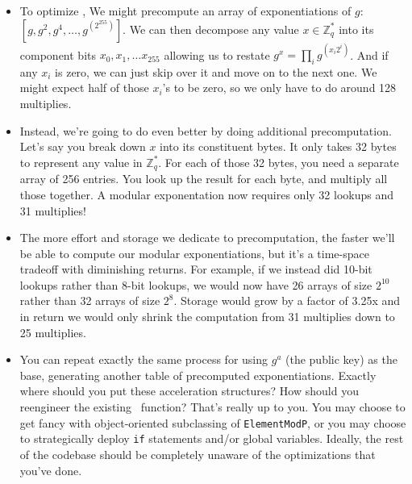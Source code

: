 \begin{itemize}
\item To optimize , We might
  precompute an array of exponentiations of $g$: $\left[g, g^2, g^4, \ldots,
    g^{\left(2^{255}\right)}\right]$.
  We can then decompose any value $x \in \mathbb{Z}_q^*$
  into its component bits $x_{0},x_{1},\ldots x_{255}$
  allowing us to restate $g^x = \prod_i g^{\left(x_i 2^i\right)}$. And if
  any $x_i$ is zero, we can just skip over it and move on to the next one.
  We might expect half of those $x_i$'s to be zero, so we only have to
  do around 128 multiplies.

\item Instead, we're going to do even better by doing additional
  precomputation. Let's say you break down $x$ into its constituent bytes.
  It only takes 32 bytes to represent any value in $\mathbb{Z}_q^*$.
  For each of those 32 bytes, you need a separate array of 256 entries.
  You look up the result for each byte, and multiply all those together.
  A modular exponentation now requires only 32 lookups and 31 multiplies!

\item The more effort and storage we dedicate to precomputation, the
  faster we'll be able to compute our modular exponentiations, but
  it's a time-space tradeoff with diminishing returns. For example, if
  we instead did 10-bit lookups rather than 8-bit lookups, we would
  now have 26 arrays of size $2^{10}$ rather than 32 arrays of size
  $2^8$. Storage would grow by a factor of 3.25x and in return we
  would only shrink the computation from 31 multiplies down to 25
  multiplies.
  
\item You can repeat exactly the same process for using $g^a$ (the public
  key) as the base, generating another table of precomputed
  exponentiations. Exactly where should you put these acceleration
  structures? How should you reengineer the existing \ function?
  That's really up to you. You may choose to get fancy with
  object-oriented subclassing of {\tt ElementModP}, or you may choose
  to strategically deploy {\tt if} statements and/or global variables.
  Ideally, the rest of the codebase should be completely unaware of
  the optimizations that you've done.



\end{itemize}
